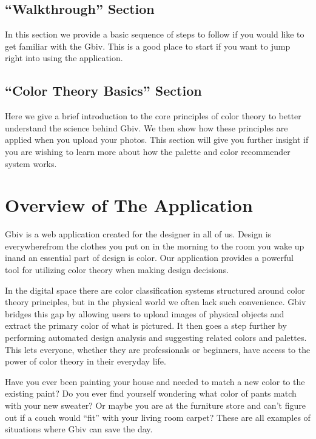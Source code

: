 \documentclass[letterpaper,10pt,english,openany,oneside]{sphinxmanual}
\begin{document}
\section{“Walkthrough” Section}
\label{\detokenize{getting_started:walkthrough-section}}
\sphinxAtStartPar
In this section we provide a basic sequence of steps to follow if you would like to get familiar with the Gbiv. This is a good place to start if you want to jump right into using the application.


\section{“Color Theory Basics” Section}
\label{\detokenize{getting_started:color-theory-basics-section}}
\sphinxAtStartPar
Here we give a brief introduction to the core principles of color theory to better understand the science behind Gbiv. We then show how these principles are applied when you upload your photos. This section will give you further insight if you are wishing to learn more about how the palette and color recommender system works.

\sphinxstepscope


\chapter{Overview of The Application}
\label{\detokenize{overview:overview-of-the-application}}\label{\detokenize{overview:overview}}\label{\detokenize{overview::doc}}
\sphinxAtStartPar
Gbiv is a web application created for the designer in all of us. Design is everywhere\textendash{}from the clothes you put on in the morning to the room you wake up in\textendash{}and an essential part of design is color. Our application provides a powerful tool for utilizing color theory when making design decisions.

\sphinxAtStartPar
In the digital space there are color classification systems structured around color theory principles, but in the physical world we often lack such convenience. Gbiv bridges this gap by allowing users to upload images of physical objects and extract the primary color of what is pictured. It then goes a step further by performing automated design analysis and suggesting related colors and palettes. This lets everyone, whether they are professionals or beginners, have access to the power of color theory in their everyday life.

\sphinxAtStartPar
Have you ever been painting your house and needed to match a new color to the existing paint? Do you ever find yourself wondering what color of pants match with your new sweater? Or maybe you are at the furniture store and can’t figure out if a couch would “fit” with your living room carpet? These are all examples of situations where Gbiv can save the day.
\end{document}
